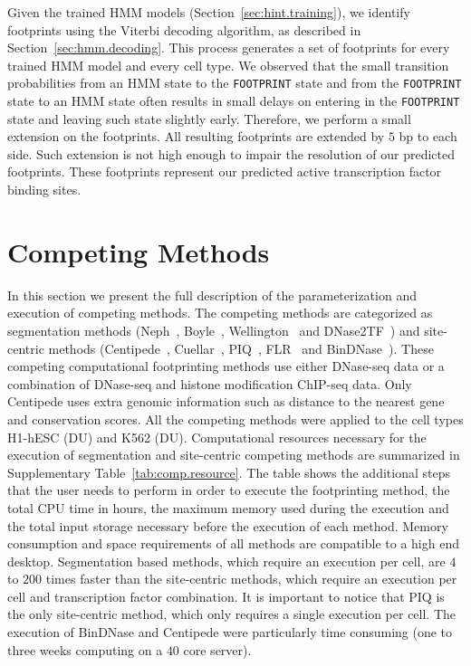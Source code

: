 Given the trained HMM models (Section~\ref{sec:hint.training}), we identify footprints using the Viterbi decoding algorithm, as described in Section~\ref{sec:hmm.decoding}. This process generates a set of footprints for every trained HMM model and every cell type. We observed that the small transition probabilities from an HMM state to the {\tt FOOTPRINT} state and from the {\tt FOOTPRINT} state to an HMM state often results in small delays on entering in the {\tt FOOTPRINT} state and leaving such state slightly early. Therefore, we perform a small extension on the footprints. All resulting footprints are extended by $5$ bp to each side. Such extension is not high enough to impair the resolution of our predicted footprints. These footprints represent our predicted active transcription factor binding sites.


\section{Competing Methods}
\label{sec:competing.methods}

In this section we present the full description of the parameterization and execution of competing methods. The competing methods are categorized as segmentation methods (Neph~\cite{neph2012a}, Boyle~\cite{boyle2011}, Wellington~\cite{piper2013} and DNase2TF~\cite{sung2014}) and site-centric methods (Centipede~\cite{pique2011}, Cuellar~\cite{cuellar2012}, PIQ~\cite{sherwood2014}, FLR~\cite{yardimci2014} and BinDNase~\cite{kahara2015}). These competing computational footprinting methods use either DNase-seq data or a combination of DNase-seq and histone modification ChIP-seq data. Only Centipede uses extra genomic information such as distance to the nearest gene and conservation scores. All the competing methods were applied to the cell types H1-hESC (DU) and K562 (DU). Computational resources necessary for the execution of segmentation and site-centric competing methods are summarized in Supplementary Table~\ref{tab:comp.resource}. The table shows the additional steps that the user needs to perform in order to execute the footprinting method, the total CPU time in hours, the maximum memory used during the execution and the total input storage necessary before the execution of each method. Memory consumption and space requirements of all methods are compatible to a high end desktop. Segmentation based methods, which require an execution per cell, are $4$ to $200$ times faster than the site-centric methods, which require an execution per cell and transcription factor combination. It is important to notice that PIQ is the only site-centric method, which only requires a single execution per cell. The execution of BinDNase and Centipede were particularly time consuming (one to three weeks computing on a $40$ core server).

